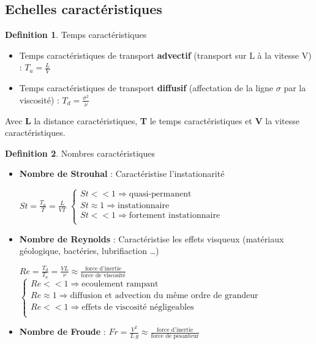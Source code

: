 \documentclass[french]{article}
\theoremstyle{definition}
\newtheorem{definition}{Definition}[section]
\begin{document}
\subsection{Echelles caractéristiques}

\begin{definition} Temps caractéristiques\par
	\begin{itemize} 
		\item Temps caractéristiques de transport \textbf{advectif} (transport sur L à la vitesse V) : $T_a = \frac{L}{V}$
		\item Temps caractéristiques de transport \textbf{diffusif} (affectation de la ligne $\sigma$ par la viscosité) : $T_d = \frac{\sigma^2}{\nu}$
	\end{itemize}
	Avec \textbf{L} la distance caractéristiques, \textbf{T} le temps caractéristiques et \textbf{V} la vitesse caractéristiques.
\end{definition}

\begin{definition} Nombres caractéristiques\par
	\begin{itemize} 
		\item \textbf{Nombre de Strouhal} : Caractéristise l'instationarité
		
		$St = \frac{T_a}{T} = \frac{L}{VT}$
		$
		\left\{
			\begin{array}{ll}
				St << 1 \Rightarrow \mbox{quasi-permanent} \\
				St \approx 1 \Rightarrow \mbox{instationnaire} \\
				St << 1 \Rightarrow \mbox{fortement instationnaire} \\
			\end{array}
		\right.
		$

		\item \textbf{Nombre de Reynolds} : Caractéristise les effets visqueux (matériaux géologique, bactéries, lubrifiaction \dots)
		
		$Re = \frac{T_d}{T_a} = \frac{VL}{\nu}  \approx \frac{\mbox{force d'inertie}}{\mbox{force de viscosité}}$
		$
		\left\{
			\begin{array}{ll}
				Re << 1 \Rightarrow \mbox{ecoulement rampant} \\
				Re \approx 1 \Rightarrow \mbox{diffusion et advection du même ordre de grandeur} \\
				Re << 1 \Rightarrow \mbox{effets de viscosité négligeables} \\
			\end{array}
		\right.
		$
		\item \textbf{Nombre de Froude} : $Fr = \frac{V^2}{L \ g}  \approx \frac{\mbox{force d'inertie}}{\mbox{force de pesanteur}}$ 
	\end{itemize} 
\end{definition}
\end{document}
